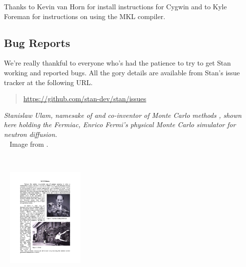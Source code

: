 Thanks to Kevin van Horn for install instructions for Cygwin and to
Kyle Foreman for instructions on using the MKL compiler.


\subsection*{Bug Reports}

We're really thankful to everyone who's had the patience to try
to get Stan working and reported bugs.  All the gory details are
available from Stan's issue tracker at the following URL.
%
\begin{quote}
\url{https://github.com/stan-dev/stan/issues}
\end{quote}




\vfill
\begin{center}
\hfill
\begin{minipage}[b]{2in}
  \footnotesize {\it Stanislaw Ulam, namesake of \Stan and co-inventor
    of Monte Carlo methods \citep{MetropolisUlam:1949}, shown here
    holding the Fermiac, Enrico Fermi's physical Monte Carlo simulator
    for neutron diffusion.}
  \\[3pt] \mbox{ } \hfill
  {\scriptsize Image from \citep{Giesler:2000}.}
\end{minipage} \ \ \ \ \
\begin{minipage}[b]{1.5in} \mbox{ } \hfill
  \includegraphics[width=1.5in]{img/ulam-fermiac.pdf}
\end{minipage}
\end{center}
